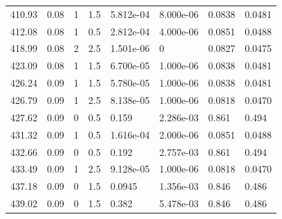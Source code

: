 \documentclass[preview]{standalone}
\begin{document}
{{{\begin{tabular}{L{1.2cm}C{1.2cm} C{0.3cm}C{0.5cm} C{1.4cm}C{1.4cm} C{1.4cm}C{1.4cm}}
  410.93  &  0.08  & 1     & 1.5 &  5.812e-04  & 8.000e-06  & 0.0838 &  0.0481   \\ 
  412.08  &  0.08  & 1     & 0.5 &  2.812e-04  & 4.000e-06  & 0.0851 &  0.0488   \\ 
  418.99  &  0.08  & 2     & 2.5 &  1.501e-06  & 0  & 0.0827 &  0.0475   \\ 
  423.09  &  0.08  & 1     & 1.5 &  6.700e-05  & 1.000e-06  & 0.0838 &  0.0481   \\ 
  426.24  &  0.09  & 1     & 1.5 &  5.780e-05  & 1.000e-06  & 0.0838 &  0.0481   \\ 
  426.79  &  0.09  & 1     & 2.5 &  8.138e-05  & 1.000e-06  & 0.0818 &  0.0470   \\ 
  427.62  &  0.09  & 0     & 0.5 &  0.159  & 2.286e-03  & 0.861 &  0.494   \\ 
  431.32  &  0.09  & 1     & 0.5 &  1.616e-04  & 2.000e-06  & 0.0851 &  0.0488   \\ 
  432.66  &  0.09  & 0     & 0.5 &  0.192  & 2.757e-03  & 0.861 &  0.494   \\ 
  433.49  &  0.09  & 1     & 2.5 &  9.128e-05  & 1.000e-06  & 0.0818 &  0.0470   \\ 
  437.18  &  0.09  & 0     & 1.5 &  0.0945  & 1.356e-03  & 0.846 &  0.486   \\ 
  439.02  &  0.09  & 0     & 1.5 &  0.382  & 5.478e-03  & 0.846 &  0.486   \\ 
\hline 
\end{tabular} 

}}}
\end{document}
